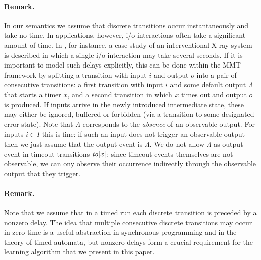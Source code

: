 \iflong
\paragraph{Remark.}
In our semantics we assume that discrete transitions occur instantaneously and take no time. In applications, however, i/o interactions
often take a significant amount of time. In \cite{SHV16}, for instance, a case study of an interventional X-ray system is
described in which a single i/o interaction may take several seconds. If it is important to model such delays
explicitly, this can be done within the MMT framework by splitting a transition with input $i$ and output $o$ into
a pair of consecutive transitions: a first transition with input $i$ and some default output $\Lambda$ that starts
a timer $x$, and a second transition in which $x$ times out and output $o$ is produced.
If inputs arrive in the newly introduced intermediate state, these may either be ignored, buffered or forbidden
(via a transition to some designated error state).
Note that $\Lambda$ corresponds to the \emph{absence} of an observable output. For inputs $i \in I$ this is fine: if such
an input does not trigger an observable output then we just assume that the output event is $\Lambda$. We do not allow
$\Lambda$ as output event in timeout transitions $\mathit{to}[x]$: since timeout events themselves are not observable, we can ony observe their occurrence indirectly through the observable output that they trigger.

\paragraph{Remark.}
Note that we assume that in a timed run each discrete transition is preceded by a nonzero delay.
The idea that multiple consecutive discrete transitions may occur in zero time is a useful abstraction in synchronous
programming and in the theory of timed automata, but nonzero delays form
a crucial requirement for the learning algorithm that we present in this paper.

